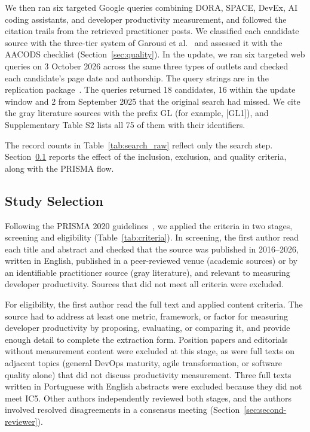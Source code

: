 \documentclass[preprint,number]{elsarticle}
\begin{document}
We then ran six targeted Google queries combining DORA, SPACE, DevEx, AI coding assistants, and developer productivity measurement, and followed the citation trails from the retrieved practitioner posts. We classified each candidate source with the three-tier system of Garousi et al.~\cite{garousi2019mlr} and assessed it with the AACODS checklist (Section~\ref{sec:quality}). In the update, we ran six targeted web queries on 3 October 2026 across the same three types of outlets and checked each candidate's page date and authorship. The query strings are in the replication package~\cite{replication2026}. The queries returned 18 candidates, 16 within the update window and 2 from September 2025 that the original search had missed. We cite the gray literature sources with the prefix GL (for example, [GL1]), and Supplementary Table S2 lists all 75 of them with their identifiers.

The record counts in Table~\ref{tab:search_raw} reflect only the search step. Section~\ref{sec:selection} reports the effect of the inclusion, exclusion, and quality criteria, along with the PRISMA flow.

\subsection{Study Selection}
\label{sec:selection}
\label{sec:prisma}

Following the PRISMA 2020 guidelines~\cite{page2021prisma}, we applied the criteria in two stages, screening and eligibility (Table~\ref{tab:criteria}). In screening, the first author read each title and abstract and checked that the source was published in 2016--2026, written in English, published in a peer-reviewed venue (academic sources) or by an identifiable practitioner source (gray literature), and relevant to measuring developer productivity. Sources that did not meet all criteria were excluded. 

For eligibility, the first author read the full text and applied content criteria. The source had to address at least one metric, framework, or factor for measuring developer productivity by proposing, evaluating, or comparing it, and provide enough detail to complete the extraction form. Position papers and editorials without measurement content were excluded at this stage, as were full texts on adjacent topics (general DevOps maturity, agile transformation, or software quality alone) that did not discuss productivity measurement. Three full texts written in Portuguese with English abstracts were excluded because they did not meet IC5. Other authors independently reviewed both stages, and the authors involved resolved disagreements in a consensus meeting (Section~\ref{sec:second-reviewer}).
\end{document}
